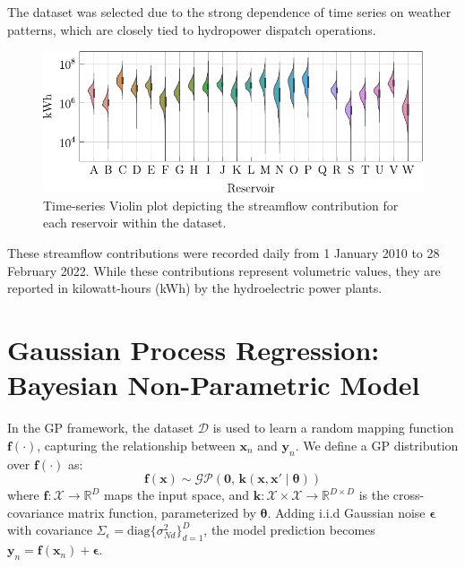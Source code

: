 \documentclass[10pt, xcolor=table]{beamer}
\begin{document}
\begin{frame}
	The dataset was selected due to the strong dependence of time series on weather patterns, which are closely tied to hydropower dispatch operations.
	
	\begin{figure}[htbp]
		\centering
		\includegraphics[height=0.25\textwidth]{images/ct_violinplot.pdf}
		\caption{Time-series Violin plot depicting the streamflow contribution for each reservoir within the dataset.}
	\end{figure}	
	
	These streamflow contributions were recorded daily from 1 January 2010 to 28 February 2022. While these contributions represent volumetric values, they are reported in kilowatt-hours (kWh) by the hydroelectric power plants.
\end{frame}



\section[Gaussian Process Regression]{Gaussian Process Regression: Bayesian Non-Parametric Model}
\begin{frame}
	In the GP framework, the dataset $\mathcal{D}$ is used to learn a random mapping function $\bm{f}(\cdot)$, capturing the relationship between $\bm{x}_n$ and $\bm{y}_n$. We define a GP distribution over $\bm{f}(\cdot)$ as:
	\begin{equation}\label{mogp_notation}
	\bm{f}(\bm{x}) \sim  \mathcal{GP}\left(\bm{0},\, \bm{k}(\bm{x}, \bm{x}' \mid \bm{\theta})\right)
	\end{equation}
	where $\bm{f}: \mathcal{X} \rightarrow \mathbb{R}^D$ maps the input space, and $\bm{k}: \mathcal{X} \times \mathcal{X} \rightarrow \mathbb{R}^{D \times D}$ is the cross-covariance matrix function, parameterized by $\bm{\theta}$. Adding i.i.d Gaussian noise $\bm{\epsilon}$ with covariance $\Sigma_\epsilon = \text{diag}\{\sigma^2_{Nd}\}_{d=1}^D$, the model prediction becomes $\bm{y}_n = \bm{f}(\bm{x}_n) + \bm{\epsilon}$.
\end{frame}
\end{document}

